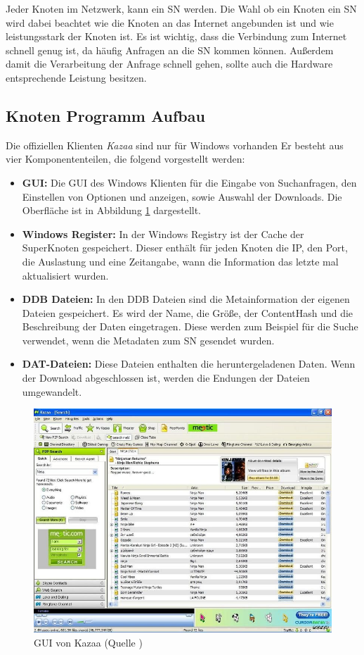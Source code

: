 Jeder Knoten im Netzwerk, kann ein SN werden.
Die Wahl ob ein Knoten ein SN wird dabei beachtet wie die Knoten an  das Internet angebunden ist und wie leistungsstark der Knoten ist.
Es ist wichtig, dass die Verbindung zum Internet schnell genug ist, da häufig Anfragen an die SN kommen können.
Außerdem damit die Verarbeitung der Anfrage schnell gehen, sollte auch die Hardware  entsprechende Leistung besitzen.

\subsection{Knoten Programm Aufbau}
\label{subsec:proAuf}

Die offiziellen Klienten \textit{Kazaa}\cite{kazaa} sind nur für Windows vorhanden
Er besteht aus vier Komponententeilen, die folgend vorgestellt werden:

\begin{itemize}
\item[1.] \textbf{GUI:} Die GUI des Windows Klienten für die Eingabe von Suchanfragen, den Einstellen von Optionen und anzeigen, sowie Auswahl der Downloads.
Die Oberfläche ist in Abbildung \ref{fig:kazgui} dargestellt.
\item[2.] \textbf{Windows Register:} In der Windows Registry ist der Cache der SuperKnoten gespeichert.
Dieser enthält für jeden Knoten die IP, den Port, die Auslastung und eine Zeitangabe, wann die Information das letzte mal aktualisiert wurden.
\item[3.] \textbf{DDB Dateien:} In den DDB Dateien sind die Metainformation der eigenen Dateien gespeichert.
Es wird der Name, die Größe, der ContentHash und die Beschreibung der Daten eingetragen.
Diese werden zum Beispiel für die Suche verwendet, wenn die Metadaten zum SN gesendet wurden.
\item[4.] \textbf{DAT-Dateien:} Diese Dateien enthalten die heruntergeladenen Daten.
Wenn der Download abgeschlossen ist, werden die Endungen der Dateien umgewandelt.
\end{itemize}

\begin{figure}
\includegraphics[scale=0.3]{gfx/Kazaa-search-big}
\caption{GUI von Kazaa (Quelle \cite{kazaagui})}
\label{fig:kazgui}
\end{figure}

